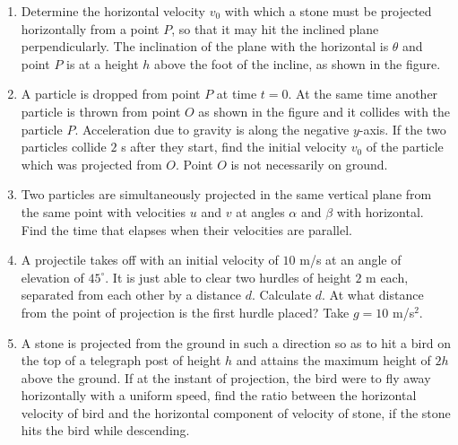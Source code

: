 \documentclass{article}
\begin{document}
\begin{enumerate}

    \item Determine the horizontal velocity \( v_0 \) with which a stone must be projected horizontally from a point \( P \), so that it may hit the inclined plane perpendicularly. The inclination of the plane with the horizontal is \( \theta \) and point \( P \) is at a height \( h \) above the foot of the incline, as shown in the figure.
    \begin{center}
    \end{center}
  
    \item A particle is dropped from point \( P \) at time \( t = 0 \). At the same time another particle is thrown from point \( O \) as shown in the figure and it collides with the particle \( P \). Acceleration due to gravity is along the negative \( y \)-axis. If the two particles collide \( 2 \) s after they start, find the initial velocity \( v_0 \) of the particle which was projected from \( O \). Point \( O \) is not necessarily on ground.
    \begin{center}
    \end{center}
  
    \item Two particles are simultaneously projected in the same vertical plane from the same point with velocities \( u \) and \( v \) at angles \( \alpha \) and \( \beta \) with horizontal. Find the time that elapses when their velocities are parallel.
    
    \item A projectile takes off with an initial velocity of \( 10 \) m/s at an angle of elevation of \( 45^\circ \). It is just able to clear two hurdles of height \( 2 \) m each, separated from each other by a distance \( d \). Calculate \( d \). At what distance from the point of projection is the first hurdle placed? Take \( g = 10 \) m/s\(^2\).
    
    \item A stone is projected from the ground in such a direction so as to hit a bird on the top of a telegraph post of height \( h \) and attains the maximum height of \( 2h \) above the ground. If at the instant of projection, the bird were to fly away horizontally with a uniform speed, find the ratio between the horizontal velocity of bird and the horizontal component of velocity of stone, if the stone hits the bird while descending.
  

\end{enumerate}
\end{document}
